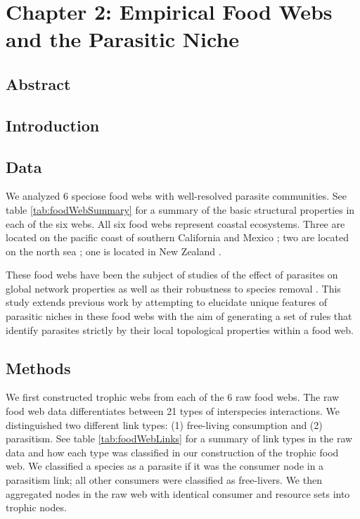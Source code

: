 \documentclass{article}
\title{}
\begin{document}
\maketitle

\chapter{Chapter 2: Empirical Food Webs and the Parasitic Niche}

\section{Abstract}

\section{Introduction}

\section{Data} We analyzed 6 speciose food webs with well-resolved parasite
communities. See table \ref{tab:foodWebSummary} for a summary of the basic
structural properties in each of the six webs. All six food webs represent
coastal ecosystems. Three are located on the pacific coast of southern
California and Mexico \cite{Hechinger2011}; two are located on the north sea
\cite{Thieltges2005,Zander2011}; one is located in New Zealand
\cite{Mouritsen2006}. 

These food webs have been the subject of studies of the effect of parasites on
global network properties as well as their robustness to species removal
\cite{Dunne2013,Lafferty2012}. This study extends previous work by attempting
to elucidate unique features of parasitic niches in these food webs with the
aim of generating a set of rules that identify parasites strictly by their
local topological properties within a food web.

\section{Methods} We first constructed trophic webs from each of the 6 raw food
webs. The raw food web data differentiates between 21 types of interspecies
interactions. We distinguished two different link types: (1) free-living
consumption and (2) parasitism. See table \ref{tab:foodWebLinks} for a summary
of link types in the raw data and how each type was classified in our
construction of the trophic food web. We classified a species as a parasite if
it was the consumer node in a parasitism link; all other consumers were
classified as free-livers. We then aggregated nodes in the raw web with
identical consumer and resource sets into trophic nodes. 
\end{document}
